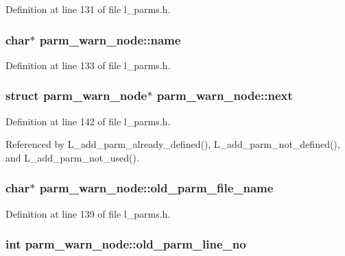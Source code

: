 Definition at line 131 of file l\_\-parms.h.
\subsubsection{\setlength{\rightskip}{0pt plus 5cm}char$\ast$ \bf{parm\_\-warn\_\-node::name}}\label{structparm__warn__node_391dcfffe608e105c22ada54a57909ff}




Definition at line 133 of file l\_\-parms.h.
\subsubsection{\setlength{\rightskip}{0pt plus 5cm}struct \bf{parm\_\-warn\_\-node}$\ast$ \bf{parm\_\-warn\_\-node::next}}\label{structparm__warn__node_5de49638df851cecb5e0228408cde545}




Definition at line 142 of file l\_\-parms.h.

Referenced by L\_\-add\_\-parm\_\-already\_\-defined(), L\_\-add\_\-parm\_\-not\_\-defined(), and L\_\-add\_\-parm\_\-not\_\-used().
\subsubsection{\setlength{\rightskip}{0pt plus 5cm}char$\ast$ \bf{parm\_\-warn\_\-node::old\_\-parm\_\-file\_\-name}}\label{structparm__warn__node_6fe88b61704a01c22e196bc212a2c323}




Definition at line 139 of file l\_\-parms.h.
\subsubsection{\setlength{\rightskip}{0pt plus 5cm}int \bf{parm\_\-warn\_\-node::old\_\-parm\_\-line\_\-no}}\label{structparm__warn__node_50370bee688f293fbc270c68d7b62f65}




